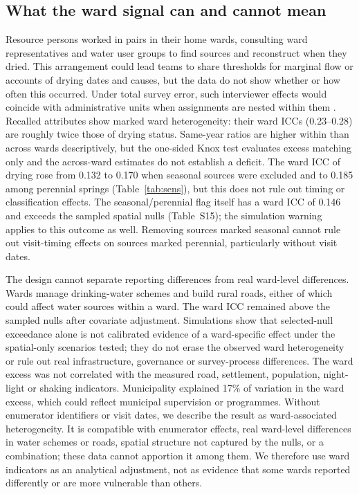 \documentclass[preprint,12pt,authoryear]{elsarticle}
\begin{document}
\subsection{What the ward signal can and cannot mean}
Resource persons worked in pairs in their home wards, consulting ward representatives and water user groups to find sources and reconstruct when they dried. This arrangement could lead teams to share thresholds for marginal flow or accounts of drying dates and causes, but the data do not show whether or how often this occurred. Under total survey error, such interviewer effects would coincide with administrative units when assignments are nested within them \citep{groves2010total, west2017interviewer, dimaio2020enumerator}. Recalled attributes show marked ward heterogeneity: their ward ICCs (0.23--0.28) are roughly twice those of drying status. Same-year ratios are higher within than across wards descriptively, but the one-sided Knox test evaluates excess matching only and the across-ward estimates do not establish a deficit. The ward ICC of drying rose from 0.132 to 0.170 when seasonal sources were excluded and to 0.185 among perennial springs (Table~\ref{tab:sens}), but this does not rule out timing or classification effects. The seasonal/perennial flag itself has a ward ICC of 0.146 and exceeds the sampled spatial nulls (Table~S15); the simulation warning applies to this outcome as well. Removing sources marked seasonal cannot rule out visit-timing effects on sources marked perennial, particularly without visit dates.

The design cannot separate reporting differences from real ward-level differences. Wards manage drinking-water schemes and build rural roads, either of which could affect water sources within a ward. The ward ICC remained above the sampled nulls after covariate adjustment. Simulations show that selected-null exceedance alone is not calibrated evidence of a ward-specific effect under the spatial-only scenarios tested; they do not erase the observed ward heterogeneity or rule out real infrastructure, governance or survey-process differences. The ward excess was not correlated with the measured road, settlement, population, night-light or shaking indicators. Municipality explained 17\% of variation in the ward excess, which could reflect municipal supervision or programmes. Without enumerator identifiers or visit dates, we describe the result as ward-associated heterogeneity. It is compatible with enumerator effects, real ward-level differences in water schemes or roads, spatial structure not captured by the nulls, or a combination; these data cannot apportion it among them. We therefore use ward indicators as an analytical adjustment, not as evidence that some wards reported differently or are more vulnerable than others.
\end{document}
